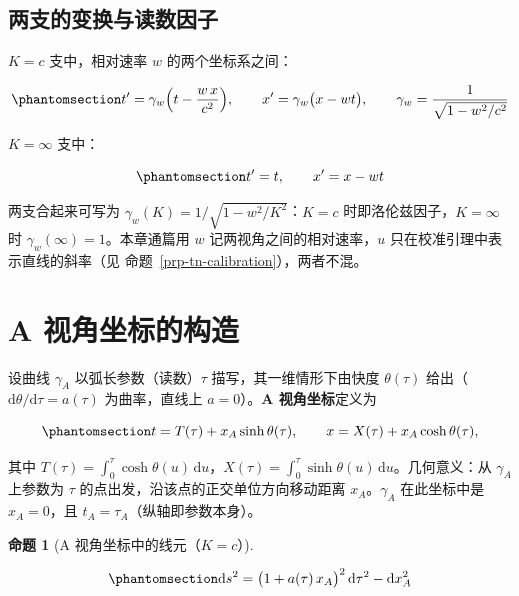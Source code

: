 \documentclass[
  chinese,
  a4paper,
  UTF8,
  12pt,
  oneside,
  openany]{ctexbook}
\theoremstyle{plain}
\theoremstyle{plain}
\theoremstyle{plain}
\newtheorem{proposition}{命题}[chapter]
\theoremstyle{definition}
\theoremstyle{plain}
\theoremstyle{plain}
\theoremstyle{remark}
\begin{document}
\subsection{两支的变换与读数因子}\label{ux4e24ux652fux7684ux53d8ux6362ux4e0eux8bfbux6570ux56e0ux5b50}

\(K=c\) 支中，相对速率 \(w\) 的两个坐标系之间：

\begin{equation}\protect\phantomsection\label{eq-tn-lorentz}{
t'=\gamma_w\Bigl(t-\frac{w\,x}{c^{2}}\Bigr),\qquad x'=\gamma_w\bigl(x-wt\bigr),\qquad
\gamma_w=\frac{1}{\sqrt{1-w^{2}/c^{2}}}
}\end{equation}

\(K=\infty\) 支中：

\begin{equation}\protect\phantomsection\label{eq-tn-galilei}{
t'=t,\qquad x'=x-wt
}\end{equation}

两支合起来可写为 \(\gamma_w(K)=1/\sqrt{1-w^{2}/K^{2}}\)：\(K=c\)
时即洛伦兹因子，\(K=\infty\) 时 \(\gamma_w(\infty)=1\)。本章通篇用 \(w\)
记两视角之间的相对速率，\(u\) 只在校准引理中表示直线的斜率（见
命题~\ref{prp-tn-calibration}），两者不混。

\section{A 视角坐标的构造}\label{sec-tn-construct}

设曲线 \(\gamma_A\) 以弧长参数（读数）\(\tau\) 描写，其一维情形下由快度
\(\theta(\tau)\) 给出（\(\mathrm{d}\theta/\mathrm{d}\tau=a(\tau)\)
为曲率，直线上 \(a=0\)）。\textbf{A 视角坐标}定义为

\begin{equation}\protect\phantomsection\label{eq-tn-fermi}{
t=T(\tau)+x_A\sinh\theta(\tau),\qquad
x=X(\tau)+x_A\cosh\theta(\tau),
}\end{equation}

其中
\(T(\tau)=\int_0^{\tau}\cosh\theta(u)\,\mathrm{d}u\)，\(X(\tau)=\int_0^{\tau}\sinh\theta(u)\,\mathrm{d}u\)。几何意义：从
\(\gamma_A\) 上参数为 \(\tau\) 的点出发，沿该点的正交单位方向移动距离
\(x_A\)。\(\gamma_A\) 在此坐标中是 \(x_A=0\)，且
\(t_A=\tau_A\)（纵轴即参数本身）。

\begin{proposition}[A
视角坐标中的线元（\(K=c\)）]\protect\hypertarget{prp-tn-metric}{}\label{prp-tn-metric}

\begin{equation}\protect\phantomsection\label{eq-tn-metric-c}{
\mathrm{d}s^{2}=\bigl(1+a(\tau)\,x_A\bigr)^{2}\,\mathrm{d}\tau^{2}-\mathrm{d}x_A^{2}
}\end{equation}

\end{proposition}
\end{document}
